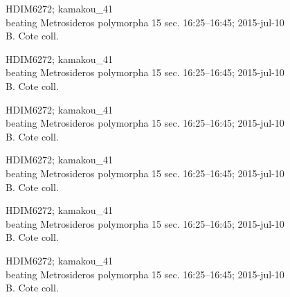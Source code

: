 \documentclass[2pt]{extarticle}
\begin{document}
\noindent
\parbox{0.16\textwidth}{\tiny \raggedright \rule[-0.3\baselineskip]{0pt}{10pt}HDIM6272; kamakou\_41\\ beating Metrosideros polymorpha 15 sec. 16:25--16:45; 2015-jul-10\\ B. Cote coll.}
\parbox{0.16\textwidth}{\tiny \raggedright \rule[-0.3\baselineskip]{0pt}{10pt}HDIM6272; kamakou\_41\\ beating Metrosideros polymorpha 15 sec. 16:25--16:45; 2015-jul-10\\ B. Cote coll.}
\parbox{0.16\textwidth}{\tiny \raggedright \rule[-0.3\baselineskip]{0pt}{10pt}HDIM6272; kamakou\_41\\ beating Metrosideros polymorpha 15 sec. 16:25--16:45; 2015-jul-10\\ B. Cote coll.}
\parbox{0.16\textwidth}{\tiny \raggedright \rule[-0.3\baselineskip]{0pt}{10pt}HDIM6272; kamakou\_41\\ beating Metrosideros polymorpha 15 sec. 16:25--16:45; 2015-jul-10\\ B. Cote coll.}
\parbox{0.16\textwidth}{\tiny \raggedright \rule[-0.3\baselineskip]{0pt}{10pt}HDIM6272; kamakou\_41\\ beating Metrosideros polymorpha 15 sec. 16:25--16:45; 2015-jul-10\\ B. Cote coll.}
\parbox{0.16\textwidth}{\tiny \raggedright \rule[-0.3\baselineskip]{0pt}{10pt}HDIM6272; kamakou\_41\\ beating Metrosideros polymorpha 15 sec. 16:25--16:45; 2015-jul-10\\ B. Cote coll.} \\ 
\vspace{0.001in} 
\end{document}
